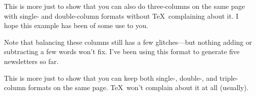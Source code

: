 \endcolumns                                     %


\articlesep                                     %

%
%


This is more just to show that you can also do three-columns on the same page
with single- and double-column formats without \TeX\ complaining about it.
I hope this example has been of some use to you.

Note that balancing these columns still has a few glitches---but nothing adding
or subtracting a few words won't fix.  I've been using this format to generate
five newsletters so far.

\endcolumns

\articlesep

This is more just to show that you can keep both single-, double-, and
triple-column formats on the same page.  \TeX\ won't complain about it
at all (usually).\eoa


\bye
